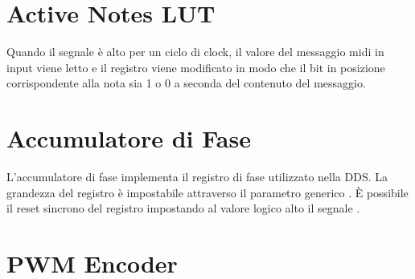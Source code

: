 \section{Active Notes LUT}
\label{sec:noteslut}

\begin{center}
\end{center}
Quando il segnale  è alto per un ciclo di clock, il valore del messaggio midi in input viene letto e il registro  viene modificato in modo che il bit in posizione corrispondente alla nota sia 1 o 0 a seconda del contenuto del messaggio.

\section{Accumulatore di Fase}
\label{sec:phaseaccumulator}

\begin{center}
\end{center}
L'accumulatore di fase implementa il registro di fase utilizzato nella DDS.
La grandezza del registro è impostabile attraverso il parametro generico .
È possibile il reset sincrono del registro impostando al valore logico alto il segnale .

\section{PWM Encoder}
\label{sec:pwmencoder}

